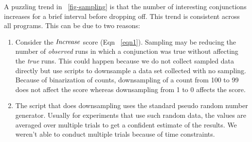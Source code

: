 A puzzling trend in ~\autoref{fig-sampling} is that the number of interesting conjunctions increases for a brief interval before dropping off.  This trend is consistent across all programs.  This can be due to two reasons:
\begin{enumerate}
\item Consider the $\mathit{Increase}$ score (Eqn ~\ref{eqn1}).  Sampling may be reducing the number of \emph{observed} runs in which a conjunction was true without affecting the \emph{true} runs.  This could happen because we do not collect sampled data directly but use scripts to downsample a data set collected with no sampling.  Because of binarization of counts, downsampling of a count from 100 to 99 does not affect the score whereas downsampling from 1 to 0 affects the score. 
\item The script that does downsampling uses the standard pseudo random number generator.  Usually for experiments that use such random data, the values are averaged over multiple trials to get a confident estimate of the results.  We weren't able to conduct multiple trials because of time constraints.
\end{enumerate}
